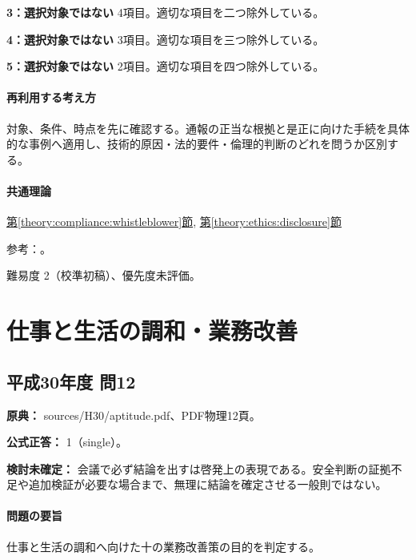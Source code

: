 \noindent\textbf{3：選択対象ではない} 4項目。適切な項目を二つ除外している。\par

\noindent\textbf{4：選択対象ではない} 3項目。適切な項目を三つ除外している。\par

\noindent\textbf{5：選択対象ではない} 2項目。適切な項目を四つ除外している。\par

\paragraph{再利用する考え方} 対象、条件、時点を先に確認する。通報の正当な根拠と是正に向けた手続を具体的な事例へ適用し、技術的原因・法的要件・倫理的判断のどれを問うか区別する。

\paragraph{共通理論} \hyperref[theory:compliance:whistleblower]{第\ref*{theory:compliance:whistleblower}節}, \hyperref[theory:ethics:disclosure]{第\ref*{theory:ethics:disclosure}節}

\par 参考：\cite{ipej_ethics2011,caa_handbook_pre2022,caa_current_faq}。

\par 難易度 2（校準初稿）、優先度未評価。

\section{仕事と生活の調和・業務改善}

\subsection{平成30年度 問12}
\label{q:h30-reg-apt-12}

\noindent\textbf{原典：} sources/H30/aptitude.pdf、PDF物理12頁。

\textbf{公式正答：} 1（single）。

\par\textbf{検討未確定：} 会議で必ず結論を出すは啓発上の表現である。安全判断の証拠不足や追加検証が必要な場合まで、無理に結論を確定させる一般則ではない。

\paragraph{問題の要旨} 仕事と生活の調和へ向けた十の業務改善策の目的を判定する。

